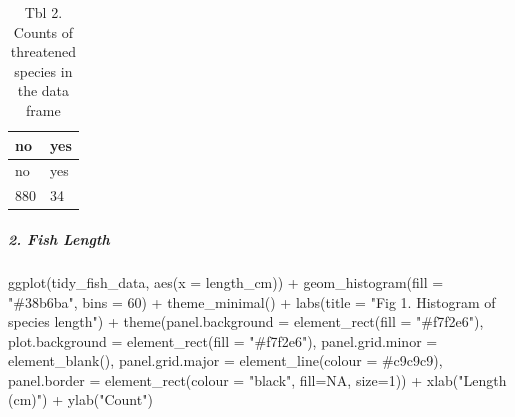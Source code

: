\documentclass[
  letterpaper,
  DIV=11,
  numbers=noendperiod]{scrartcl}
\let\oldsubparagraph\subparagraph
\renewcommand{\subparagraph}[1]{\oldsubparagraph{#1}\mbox{}}
\newenvironment{Shaded}{\begin{snugshade}}{\end{snugshade}}
\newcommand{\AttributeTok}[1]{\textcolor[rgb]{0.40,0.45,0.13}{#1}}
\newcommand{\ConstantTok}[1]{\textcolor[rgb]{0.56,0.35,0.01}{#1}}
\newcommand{\DecValTok}[1]{\textcolor[rgb]{0.68,0.00,0.00}{#1}}
\newcommand{\FunctionTok}[1]{\textcolor[rgb]{0.28,0.35,0.67}{#1}}
\newcommand{\NormalTok}[1]{\textcolor[rgb]{0.00,0.23,0.31}{#1}}
\newcommand{\SpecialCharTok}[1]{\textcolor[rgb]{0.37,0.37,0.37}{#1}}
\newcommand{\StringTok}[1]{\textcolor[rgb]{0.13,0.47,0.30}{#1}}
\begin{document}
\begin{longtable}[]{@{}ll@{}}
\caption{Tbl 2. Counts of threatened species in the data
frame}\tabularnewline
\toprule()
no & yes \\
\midrule()
\endfirsthead
\toprule()
no & yes \\
\midrule()
\endhead
880 & 34 \\
\bottomrule()
\end{longtable}

\hypertarget{fish-length}{%
\subparagraph{2. Fish Length}\label{fish-length}}

\begin{Shaded}
\begin{Highlighting}[]
\FunctionTok{ggplot}\NormalTok{(tidy\_fish\_data, }\FunctionTok{aes}\NormalTok{(}\AttributeTok{x =}\NormalTok{ length\_cm)) }\SpecialCharTok{+}
  \FunctionTok{geom\_histogram}\NormalTok{(}\AttributeTok{fill =} \StringTok{"\#38b6ba"}\NormalTok{, }\AttributeTok{bins =} \DecValTok{60}\NormalTok{) }\SpecialCharTok{+}
  \FunctionTok{theme\_minimal}\NormalTok{() }\SpecialCharTok{+}
  \FunctionTok{labs}\NormalTok{(}\AttributeTok{title =} \StringTok{"Fig 1. Histogram of species length"}\NormalTok{) }\SpecialCharTok{+}
  \FunctionTok{theme}\NormalTok{(}\AttributeTok{panel.background =} \FunctionTok{element\_rect}\NormalTok{(}\AttributeTok{fill =} \StringTok{"\#f7f2e6"}\NormalTok{),}
        \AttributeTok{plot.background =} \FunctionTok{element\_rect}\NormalTok{(}\AttributeTok{fill =} \StringTok{"\#f7f2e6"}\NormalTok{),}
        \AttributeTok{panel.grid.minor =} \FunctionTok{element\_blank}\NormalTok{(),}
        \AttributeTok{panel.grid.major =} \FunctionTok{element\_line}\NormalTok{(}\AttributeTok{colour =} \StringTok{\textquotesingle{}\#c9c9c9\textquotesingle{}}\NormalTok{),}
        \AttributeTok{panel.border =} \FunctionTok{element\_rect}\NormalTok{(}\AttributeTok{colour =} \StringTok{"black"}\NormalTok{, }\AttributeTok{fill=}\ConstantTok{NA}\NormalTok{, }\AttributeTok{size=}\DecValTok{1}\NormalTok{)) }\SpecialCharTok{+}
  \FunctionTok{xlab}\NormalTok{(}\StringTok{"Length (cm)"}\NormalTok{) }\SpecialCharTok{+}
  \FunctionTok{ylab}\NormalTok{(}\StringTok{"Count"}\NormalTok{)}
\end{Highlighting}
\end{Shaded}
\end{document}
